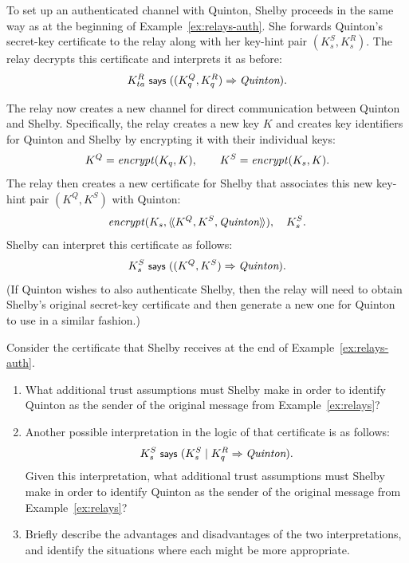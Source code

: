 \begin{example}\label{ex:relays-auth-channel}
  To set up an authenticated channel with Quinton, Shelby proceeds in
  the same way as at the beginning of Example~\ref{ex:relays-auth}.  
  She
  forwards Quinton's secret-key certificate to the relay along with her
  key-hint pair $(K_s^S,K_s^R)$.  The relay decrypts this certificate
  and interprets it as before:
  \[ K_{ta}^R \says ((K_q^Q, K_q^R) \speaksfor \name{Quinton}). \]

  The relay now creates a new channel for direct
  communication between Quinton and Shelby.  Specifically, the relay
  creates a new key $K$ and creates key identifiers for Quinton and
  Shelby by encrypting it with their individual keys:
  \[ K^Q = \encrypt{K}{K_q}, \qquad K^S = \encrypt{K}{K_s}. \]
  The relay then creates a new certificate for Shelby that associates
  this new key-hint pair $(K^Q,K^S)$ with Quinton:
  \[ \encrypt{\cat{K^Q,K^S,\name{Quinton}}}{K_s}, \quad
  K_s^S. \]
  Shelby can interpret this certificate as follows:
  \[ K_s^S \says ((K^Q, K^S) \speaksfor \name{Quinton}). \] 
  (If Quinton wishes to also authenticate Shelby, then the relay will
  need to obtain Shelby's original secret-key certificate and then
  generate a new one for Quinton to use in a similar fashion.)
\end{example}

\begin{exercise}[\eval]Consider the certificate that Shelby receives at
  the end of   Example~\ref{ex:relays-auth}.
  \begin{enumerate}
  \item What additional trust assumptions must Shelby make in order to
    identify Quinton as the sender of the original message from
    Example~\ref{ex:relays}?
  \item Another possible interpretation in the logic of that certificate
    is as follows:
    \[ K_s^S \says (K_s^S \quoting K_q^R \speaksfor \name{Quinton}). \]
    Given this interpretation, what additional trust assumptions must
    Shelby make in order to identify Quinton as the sender of the
    original message from Example~\ref{ex:relays}?
  \item Briefly describe the advantages and disadvantages of the two
    interpretations, and identify the situations where each might be
    more appropriate.
  \end{enumerate}


\end{exercise}

